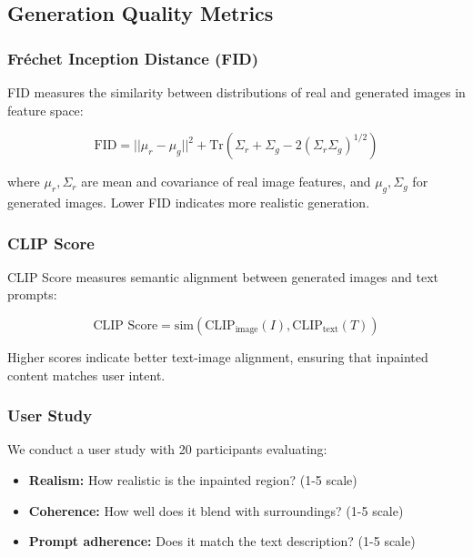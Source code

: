 \subsection{Generation Quality Metrics}

\subsubsection{Fréchet Inception Distance (FID)}

FID measures the similarity between distributions of real and generated images in feature space:

\begin{equation}
\text{FID} = ||\mu_r - \mu_g||^2 + \text{Tr}(\Sigma_r + \Sigma_g - 2(\Sigma_r \Sigma_g)^{1/2})
\end{equation}

where $\mu_r, \Sigma_r$ are mean and covariance of real image features, and $\mu_g, \Sigma_g$ for generated images. Lower FID indicates more realistic generation.

\subsubsection{CLIP Score}

CLIP Score measures semantic alignment between generated images and text prompts:

\begin{equation}
\text{CLIP Score} = \text{sim}(\text{CLIP}_{\text{image}}(I), \text{CLIP}_{\text{text}}(T))
\end{equation}

Higher scores indicate better text-image alignment, ensuring that inpainted content matches user intent.

\subsubsection{User Study}

We conduct a user study with 20 participants evaluating:
\begin{itemize}
    \item \textbf{Realism:} How realistic is the inpainted region? (1-5 scale)
    \item \textbf{Coherence:} How well does it blend with surroundings? (1-5 scale)
    \item \textbf{Prompt adherence:} Does it match the text description? (1-5 scale)
\end{itemize}

